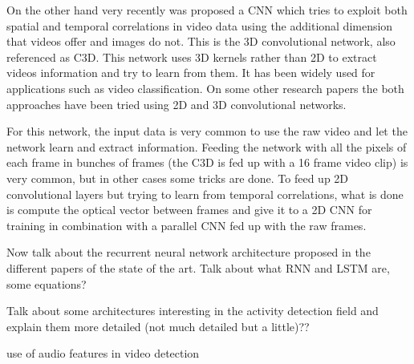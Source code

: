 
On the other hand very recently was proposed a CNN which tries to exploit both spatial and temporal correlations in video data using the additional dimension that videos offer and images do not. This is the 3D convolutional network, also referenced as C3D\cite{tran2014learning}. This network uses 3D kernels rather than 2D to extract videos information and try to learn from them. It has been widely used\cite{baccouche2011sequential}\cite{tran2015deep}\cite{tran2014learning}\cite{shoutemporal} for applications such as video classification. On some other research papers\cite{Yao_2015_ICCV}\cite{zhang2016modelling} the both approaches have been tried using 2D and 3D convolutional networks.

For this network, the input data is very common to use the raw video and let the network learn and extract information. Feeding the network with all the pixels of each frame in bunches of frames (the C3D is fed up with a 16 frame video clip) is very common, but in other cases some tricks are done. To feed up 2D convolutional layers but trying to learn from temporal correlations, what is done is compute the optical vector between frames and give it to a 2D CNN for training in combination with a parallel CNN fed up with the raw frames\cite{Ng_2015_CVPR}\cite{Yao_2015_ICCV}.


Now talk about the recurrent neural network architecture proposed in the different papers of the state of the art. Talk about what RNN and LSTM are, some equations?


Talk about some architectures interesting in the activity detection field and explain them more detailed (not much detailed but a little)??



use of audio features in video detection\cite{xu2015uts}